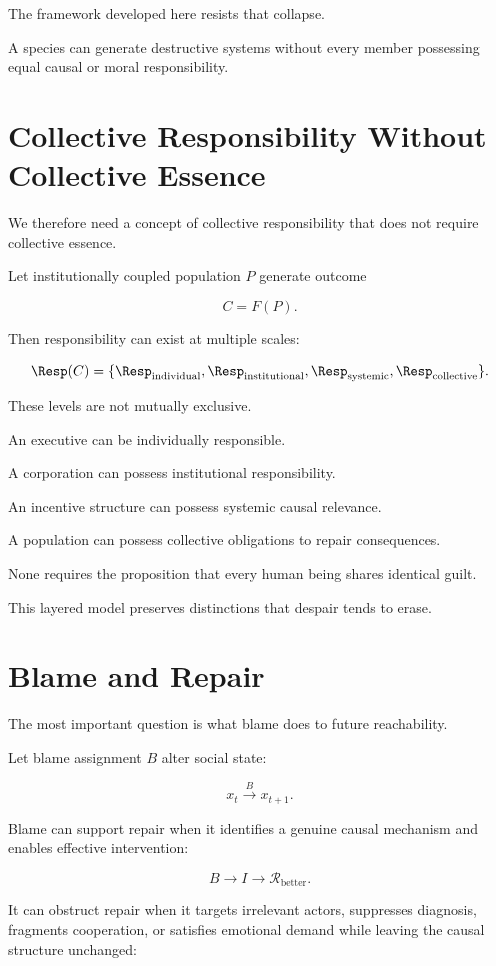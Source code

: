 \documentclass[11pt,oneside]{book}
\theoremstyle{definition}
\theoremstyle{remark}
\newcommand{\R}{\mathcal{R}}
\begin{document}
The framework developed here resists that collapse.

A species can generate destructive systems without every member possessing equal causal or moral responsibility.

\section{Collective Responsibility Without Collective Essence}

We therefore need a concept of collective responsibility that does not require collective essence.

Let institutionally coupled population \(P\) generate outcome

\[
C=F(P).
\]

Then responsibility can exist at multiple scales:

\[
\Resp(C)
=
\{
\Resp_{\mathrm{individual}},
\Resp_{\mathrm{institutional}},
\Resp_{\mathrm{systemic}},
\Resp_{\mathrm{collective}}
\}.
\]

These levels are not mutually exclusive.

An executive can be individually responsible.

A corporation can possess institutional responsibility.

An incentive structure can possess systemic causal relevance.

A population can possess collective obligations to repair consequences.

None requires the proposition that every human being shares identical guilt.

This layered model preserves distinctions that despair tends to erase.

\section{Blame and Repair}

The most important question is what blame does to future reachability.

Let blame assignment \(B\) alter social state:

\[
x_t\xrightarrow{B}x_{t+1}.
\]

Blame can support repair when it identifies a genuine causal mechanism and enables effective intervention:

\[
B
\rightarrow
I
\rightarrow
\R_{\mathrm{better}}.
\]

It can obstruct repair when it targets irrelevant actors, suppresses diagnosis, fragments cooperation, or satisfies emotional demand while leaving the causal structure unchanged:
\end{document}
